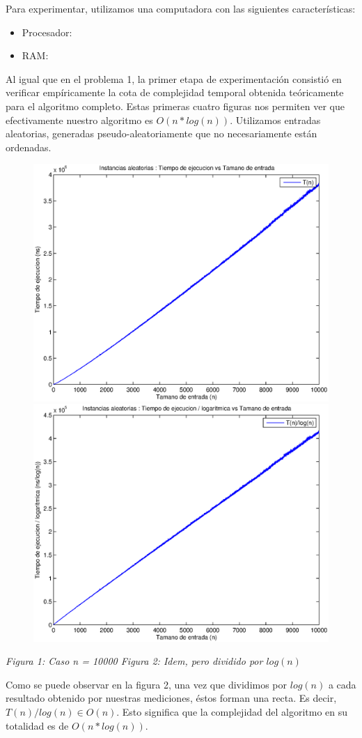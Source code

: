 Para experimentar, utilizamos una computadora con las siguientes características:

\begin{itemize}
 \item Procesador: 
 \item RAM: 
\end{itemize}

Al igual que en el problema 1, la primer etapa de experimentación consistió en verificar empíricamente la cota de complejidad temporal obtenida teóricamente para el algoritmo completo. Estas primeras cuatro figuras nos permiten ver que efectivamente nuestro algoritmo es $O(n * log(n))$. Utilizamos entradas aleatorias, generadas pseudo-aleatoriamente que no necesariamente están ordenadas.

\begin{figure}[H]
    \includegraphics[width=0.5\linewidth]{problema2/graficos/problema2_aleatoria_10000.eps}
    \includegraphics[width=0.5\linewidth]{problema2/graficos/problema2_aleatoria_10000_div_logn.eps}
\end{figure}
\emph{\hspace{2,5cm}Figura 1: Caso n = 10000 \hspace{2,5cm}Figura 2: Idem, pero dividido por $log(n)$}

Como se puede observar en la figura 2, una vez que dividimos por $log(n)$ a cada resultado obtenido por nuestras mediciones, éstos forman una recta. Es decir, $T(n)/log(n) \in O(n)$. Esto significa que la complejidad del algoritmo en su totalidad es de $O(n * log(n))$.
  
